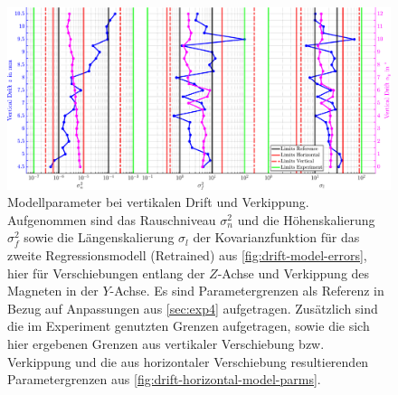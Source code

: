 \clearpage
\begin{landscape}
	\begin{figure}[tbph]
		\centering
		\includegraphics[width=\linewidth]{chapters/images/4-EuOExp/Drift-Vertical-Model-Parms}
		\caption[Modellparameter bei vertikalem Drift und Verkippung]{Modellparameter bei vertikalen Drift und Verkippung. Aufgenommen sind das Rauschniveau $\sigma_n^2$ und die Höhenskalierung $\sigma_f^2$ sowie die Längenskalierung $\sigma_l$ der Kovarianzfunktion für das zweite Regressionsmodell (Retrained) aus \autoref{fig:drift-model-errors}, hier für Verschiebungen entlang der $Z$-Achse und Verkippung des Magneten in der $Y$-Achse. Es sind Parametergrenzen als Referenz in Bezug auf Anpassungen aus \autoref{sec:exp4} aufgetragen. Zusätzlich sind die im Experiment genutzten Grenzen aufgetragen, sowie die sich hier ergebenen Grenzen aus vertikaler Verschiebung bzw. Verkippung und die aus horizontaler Verschiebung resultierenden Parametergrenzen aus \autoref{fig:drift-horizontal-model-parms}.}
		\label{fig:drift-vertical-model-parms}
	\end{figure}
\end{landscape}


